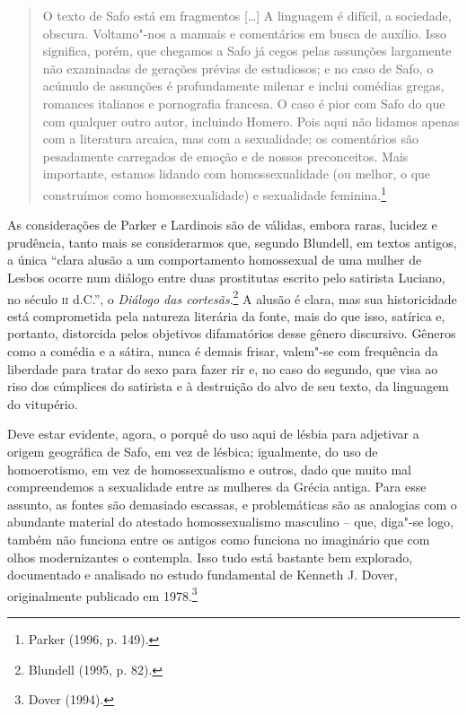 \begin{quote}
O texto de Safo está em fragmentos [\ldots{}] A linguagem é difícil, a sociedade,
obscura. Voltamo"-nos a manuais e comentários em busca de auxílio. Isso
significa, porém, que chegamos a Safo já cegos pelas assunções largamente não
examinadas de gerações prévias de estudiosos; e no caso de Safo, o acúmulo de
assunções é profundamente milenar e inclui comédias gregas, romances italianos
e pornografia francesa. O caso é pior com Safo do que com qualquer outro autor,
incluindo Homero. Pois aqui não lidamos apenas com a literatura arcaica, mas
com a sexualidade; os comentários são pesadamente carregados de emoção e de
nossos preconceitos. Mais importante, estamos lidando com homossexualidade (ou
melhor, o que construímos como homossexualidade) e sexualidade feminina.\footnote{ Parker (1996, p. 149).}
\end{quote}

As considerações de Parker e Lardinois são de válidas, embora raras, lucidez e
prudência, tanto mais se considerarmos que, segundo Blundell, em
textos antigos, a única “clara alusão a um comportamento homossexual de uma
mulher de Lesbos ocorre num diálogo entre duas prostitutas escrito pelo
satirista Luciano, no século \textsc{ii} d.C.”, o \textit{Diálogo das cortesãs}.\footnote{Blundell (1995, p. 82).} A
alusão é clara, mas sua historicidade está comprometida pela natureza
literária da fonte, mais do que isso, satírica e, portanto, distorcida pelos objetivos difamatórios desse gênero discursivo. Gêneros como a
comédia e a sátira, nunca é demais frisar, valem"-se com frequência da liberdade
para tratar do sexo para fazer rir e, no caso do segundo, que visa ao riso dos
cúmplices do satirista e à destruição do alvo de seu texto, da linguagem do
vitupério. 

Deve estar evidente, agora, o porquê do uso aqui de lésbia para adjetivar a origem geográfica de Safo, em vez de lésbica; igualmente, do uso de homoerotismo, em vez de homossexualismo e outros, dado que muito mal compreendemos a sexualidade entre as mulheres da Grécia antiga. Para esse assunto, as fontes são demasiado escassas, e problemáticas são as analogias
com o abundante material do atestado homossexualismo masculino -- que,
diga"-se logo, também não funciona entre os antigos como funciona no imaginário
que com olhos modernizantes o contempla. Isso tudo está bastante
bem explorado, documentado e analisado no estudo fundamental de Kenneth J.
Dover, originalmente publicado em 1978.\footnote{ Dover (1994).}

